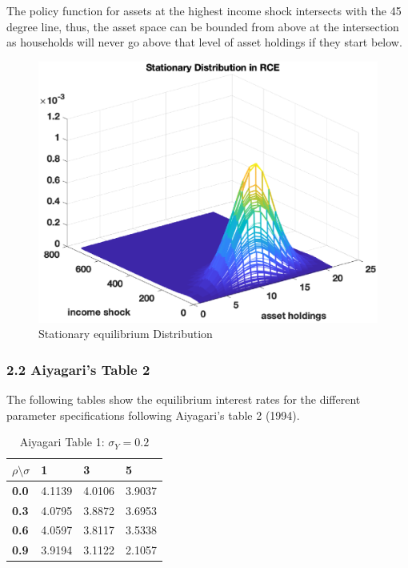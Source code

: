 \documentclass[letterpaper,12pt]{article}
\begin{document}
The policy function for assets at the highest income shock intersects with the 45 degree line, thus, the asset space can be bounded from above at the intersection as households will never go above that level of asset holdings if they start below. \\
\begin{figure}
\includegraphics[scale=0.5]{Figures/Part2_GE/StationaryDist}
\caption{Stationary equilibrium Distribution}
\end{figure}




\newpage
\subsubsection*{2.2 Aiyagari's Table 2}
The following tables show the equilibrium interest rates for the different parameter specifications following Aiyagari's table 2 (1994).

\begin{table}
\begin{tabular}{llll}
\textbf{$\rho \setminus \sigma$} & \textbf{1} & \textbf{3} & \textbf{5} \\ \hline
\textbf{0.0}      & 4.1139       & 4.0106         & 3.9037        \\
\textbf{0.3}      & 4.0795       & 3.8872         & 3.6953        \\
\textbf{0.6}      & 4.0597       & 3.8117         & 3.5338        \\
\textbf{0.9}      & 3.9194       & 3.1122         & 2.1057       
\end{tabular}
\caption{Aiyagari Table 1: $\sigma_Y = 0.2$}
\end{table}
\end{document}
